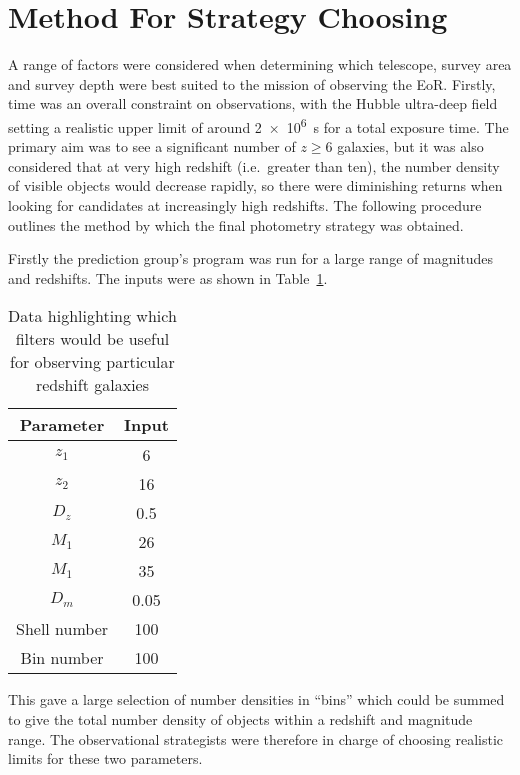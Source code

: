 
\section{Method For Strategy Choosing} %
\label{sec:method_for_strategy_choosing}
	A range of factors were considered when determining which telescope, survey area and survey depth were best suited to the mission of observing the EoR. Firstly, time was an overall constraint on observations, with the Hubble ultra-deep field setting a realistic upper limit of around \SI{2e6}{\second} for a total exposure time. The primary aim was to see a significant number of $z\ge6$ galaxies, but it was also considered that at very high redshift (i.e.\ greater than ten), the number density of visible objects would decrease rapidly, so there were diminishing returns when looking for candidates at increasingly high redshifts. The following procedure outlines the method by which the final photometry strategy was obtained.

	Firstly the prediction group’s program was run for a large range of magnitudes and redshifts. The inputs were as shown in Table~\ref{tab:program_inputs}.
	\begin{table}[!htbp]
		\begin{center}
			\begin{tabular}{c|c}
				Parameter 	& Input \\
				\hline \hline
				$z_1$ & 6 \\
				$z_2$ & 16 \\
				$D_z$ & 0.5 \\
				$M_1$ & 26 \\
				$M_1$ & 35 \\
				$D_m$ & 0.05 \\
				Shell number & 100 \\
				Bin number & 100
			\end{tabular}
		\end{center}
		\caption{Data highlighting which filters would be useful for observing particular redshift galaxies\cite{Galactic_Astronomy_Binney_Merrifield}\label{tab:program_inputs}}
	\end{table}

	This gave a large selection of number densities in ``bins'' which could be summed to give the total number density of objects within a redshift and magnitude range. The observational strategists were therefore in charge of choosing realistic limits for these two parameters.

